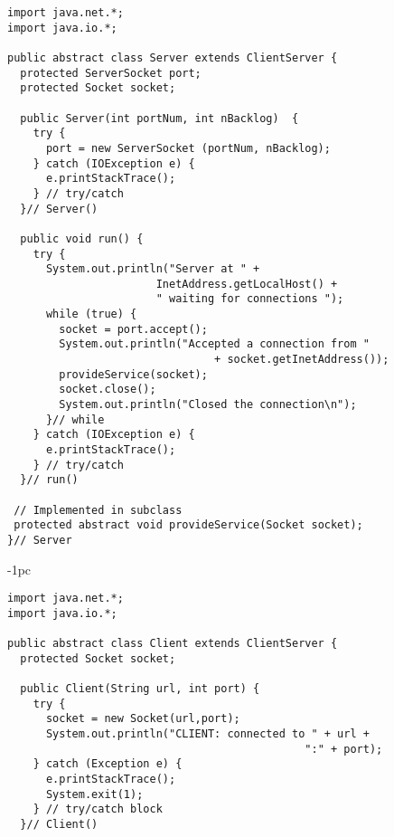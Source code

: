 {

\begin{figure}[htb]
\jjjprogstart
\begin{jjjlisting}[27pc]
\begin{lstlisting}
import java.net.*;
import java.io.*;

public abstract class Server extends ClientServer {
  protected ServerSocket port;
  protected Socket socket;

  public Server(int portNum, int nBacklog)  {
    try {
      port = new ServerSocket (portNum, nBacklog);
    } catch (IOException e) {
      e.printStackTrace();
    } // try/catch
  }// Server()

  public void run() {
    try {
      System.out.println("Server at " + 
                       InetAddress.getLocalHost() +
                       " waiting for connections ");
      while (true) {
        socket = port.accept();
        System.out.println("Accepted a connection from " 
                                + socket.getInetAddress());
        provideService(socket);
        socket.close();
        System.out.println("Closed the connection\n");
      }// while
    } catch (IOException e) {
      e.printStackTrace();
    } // try/catch 
  }// run()

 // Implemented in subclass
 protected abstract void provideService(Socket socket);  
}// Server
\end{lstlisting}
\end{jjjlisting}
\end{figure}


\begin{figure}[htb]
\jjjprogstart
\begin{jjjlistingleft}[27pc]{-1pc}
\begin{lstlisting}
import java.net.*;
import java.io.*;

public abstract class Client extends ClientServer {
  protected Socket socket;

  public Client(String url, int port) {
    try {
      socket = new Socket(url,port);
      System.out.println("CLIENT: connected to " + url + 
                                              ":" + port);
    } catch (Exception e) {
      e.printStackTrace();
      System.exit(1);
    } // try/catch block
  }// Client()


\end{lstlisting}
\end{jjjlistingleft}
\end{figure}}
